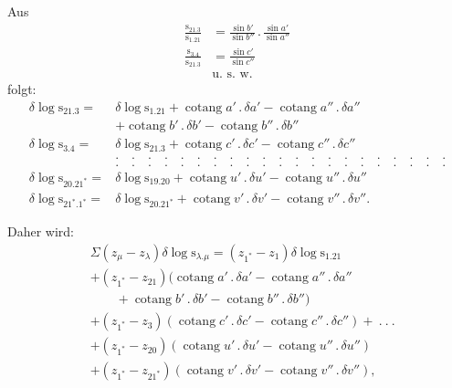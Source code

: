 \par\noindent\hspace*{\parindent}Aus
\[
\begin{aligned}
\frac{\mathrm{s}_{21.3}}{\mathrm{s}_{1.21}}&=\frac{\sin b'}{\sin b''}\,.\,\frac{\sin a'}{\sin a''}\\[7pt]
\frac{\mathrm{s}_{3.4}}{\mathrm{s}_{21.3}}&=\frac{\sin c'}{\sin c''}\\[5pt]
&\text{u. s. w.}
\end{aligned}
\]
\noindent folgt:
\[
\begin{aligned}
\delta\log\mathrm{s}_{21.3}={}&\delta\log\mathrm{s}_{1.21}+\operatorname{cotang}a'\,.\,\delta a'-\operatorname{cotang}a''\,.\,\delta a''\\
&+\operatorname{cotang}b'\,.\,\delta b'-\operatorname{cotang}b''\,.\,\delta b''\\
\delta\log\mathrm{s}_{3.4}={}&\delta\log\mathrm{s}_{21.3}+\operatorname{cotang}c'\,.\,\delta c'-\operatorname{cotang}c''\,.\,\delta c''\\
&.\quad.\quad.\quad.\quad.\quad.\quad.\quad.\quad.\quad.\quad.\quad.\quad.\quad.\quad.\quad.\quad.\quad.\quad.\quad.\quad.\\
&.\quad.\quad.\quad.\quad.\quad.\quad.\quad.\quad.\quad.\quad.\quad.\quad.\quad.\quad.\quad.\quad.\quad.\quad.\quad.\quad.\\
\delta\log\mathrm{s}_{20.21^*}={}&\delta\log\mathrm{s}_{19.20}+\operatorname{cotang}u'\,.\,\delta u'-\operatorname{cotang}u''\,.\,\delta u''\\
\delta\log\mathrm{s}_{21^*.1^*}={}&\delta\log\mathrm{s}_{20.21^*}+\operatorname{cotang}v'\,.\,\delta v'-\operatorname{cotang}v''\,.\,\delta v''.
\end{aligned}
\]
\par\noindent\hspace*{\parindent}Daher wird:
\[
\begin{aligned}
&\Sigma(z_\mu-z_\lambda)\delta\log\mathrm{s}_{\lambda.\mu}=(z_{1^*}-z_1)\delta\log\mathrm{s}_{1.21}\\
&+(z_{1^*}-z_{21})\bigl(\operatorname{cotang}a'\,.\,\delta a'-\operatorname{cotang}a''\,.\,\delta a''\\
&\qquad+\operatorname{cotang}b'\,.\,\delta b'-\operatorname{cotang}b''\,.\,\delta b''\bigr)\\
&+(z_{1^*}-z_3)(\operatorname{cotang}c'\,.\,\delta c'-\operatorname{cotang}c''\,.\,\delta c'')+\ .\ .\ .\\
&+(z_{1^*}-z_{20})(\operatorname{cotang}u'\,.\,\delta u'-\operatorname{cotang}u''\,.\,\delta u'')\\
&+(z_{1^*}-z_{21^*})(\operatorname{cotang}v'\,.\,\delta v'-\operatorname{cotang}v''\,.\,\delta v''),
\end{aligned}
\]

